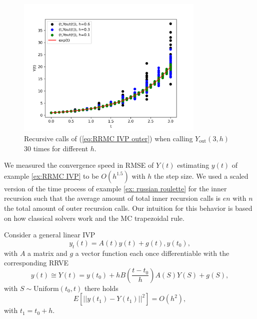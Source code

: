 \documentclass[a4paper,12pt]{article}
\begin{document}
\begin{pythonn} \label{py:RRMC IVP}

    \begin{figure}[h!]
        \centering
        \includegraphics[width=0.8\textwidth]{plots/RRMC IVP.png}
        \caption{Recursive calls of (\ref{eq:RRMC IVP outer})
            when calling $Y_{\text{out}}(3,h)$ $30$ times for different $h$.  }
        \label{fig:RRMC IVP}
    \end{figure}
\end{pythonn}

We measured the convergence speed in RMSE of $Y(t)$ estimating $y(t)$  of example
\ref{ex:RRMC IVP} to be $O\left(h^{1.5} \right)$ with $h$ the step size.
We used a scaled version of the time process of example \ref{ex: russian roulette}
for the inner recursion such that the average amount of total inner recursion calls
is $e n$ with $n$ the total amount of outer recursion calls.
Our intuition for this behavior is based on how classical solvers
work and the MC trapezoidal rule.

\begin{conjecture}
    Consider a general linear IVP
    \begin{equation}
        y_{t}(t)= A(t)y(t)+g(t), y(t_{0}),
    \end{equation}
    with $A$ a matrix and $g$ a vector function each
    once differentiable with the corresponding RRVE
    \begin{equation}
        y(t) \cong Y(t) = y(t_{0}) + h B \left( \frac{t-t_{0}}{h}\right)
        A(S) Y(S) + g(S),
    \end{equation}
    with $S \sim \text{Uniform}(t_{0},t)$ there holds
    \begin{equation}
        E[||y(t_{1})-Y(t_{1})||^{2}] = O(h^{2}),
    \end{equation}
    with $t_{1} = t_{0} + h$.
\end{conjecture}
\end{document}
